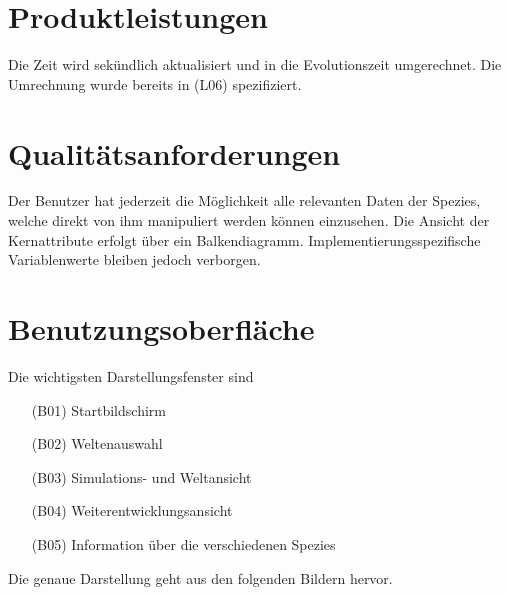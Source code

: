 \documentclass[a4paper, 10pt]{article}
\begin{document}
\section{Produktleistungen}
Die Zeit wird sekündlich aktualisiert und in die Evolutionszeit umgerechnet. Die Umrechnung wurde bereits in (L06) spezifiziert.

\section{Qualitätsanforderungen}
Der Benutzer hat jederzeit die Möglichkeit alle relevanten Daten der Spezies, welche direkt von ihm manipuliert werden können einzusehen. Die Ansicht der Kernattribute erfolgt über ein Balkendiagramm. Implementierungsspezifische Variablenwerte bleiben jedoch verborgen.

\section{Benutzungsoberfläche}
Die wichtigsten Darstellungsfenster sind
\begin{enumerate}
\item[(B01)] Startbildschirm
\item[(B02)] Weltenauswahl
\item[(B03)] Simulations- und Weltansicht
\item[(B04)] Weiterentwicklungsansicht
\item[(B05)] Information über die verschiedenen Spezies
\end{enumerate}
Die genaue Darstellung geht aus den folgenden Bildern hervor.
\end{document}
